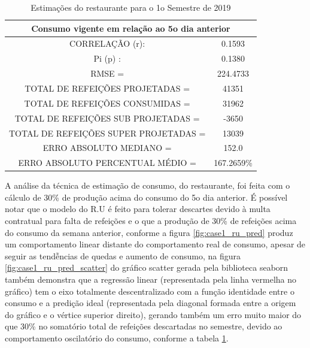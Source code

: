 \documentclass[	12pt, Times, openright, twoside, a4paper, english, brazil]{abntex2}
\begin{document}
                     \begin{table}[!ht]
                       \centering
                         \begin{tabular}{|c|c|}\hline
                            \multicolumn{2}{c}{Consumo vigente em relação ao 5o dia anterior}\\ \hline
                                CORRELAÇÃO (r): & 0.1593\\
                                Pi (p) : & 0.1380\\
                                RMSE = & 224.4733\\
                                TOTAL DE REFEIÇÕES PROJETADAS = & 41351\\ 
                                TOTAL DE REFEIÇÕES CONSUMIDAS = & 31962\\
                                TOTAL DE REFEIÇÕES SUB PROJETADAS = & -3650\\
                                TOTAL DE REFEIÇÕES SUPER PROJETADAS = & 13039\\
                                ERRO ABSOLUTO MEDIANO = & 152.0\\
                                ERRO ABSOLUTO PERCENTUAL MÉDIO = & 167.2659\% \\\hline
                        \end{tabular}
                        \caption{Estimações do restaurante para o 1o Semestre de 2019}
                        \label{table:case1_rupred}
                    \end{table}
                    
        	        A análise da técnica de estimação de consumo, do restaurante, foi feita com o cálculo de 30\% de produção acima do consumo do 5o dia anterior.
        	        É possível notar que o modelo do R.U é feito para tolerar descartes devido à multa contratual para falta de refeições e o que a produção de 30\% de refeições acima do consumo da semana anterior, conforme a figura  \ref{fig:case1_ru_pred} produz um comportamento linear distante do comportamento real de consumo, apesar de seguir as tendễncias de quedas e aumento de consumo, na figura \ref{fig:case1_ru_pred_scatter} do gráfico scatter gerada pela biblioteca seaborn também demonstra que a regressão linear (representada pela linha vermelha no gráfico) tem o eixo totalmente descentralizado com a função identidade entre o consumo e a predição ideal (representada pela diagonal formada entre a origem do gráfico e o vértice superior direito), gerando também um erro muito maior do que 30\% no somatório total de refeições descartadas no semestre, devido ao comportamento oscilatório do consumo, conforme a tabela \ref{table:case1_rupred}.
\end{document}
